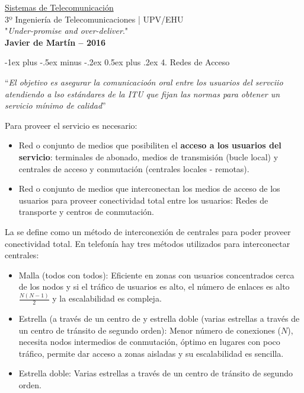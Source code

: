 \documentclass[10pt,portrait, twocolumn]{article}
\makeatletter
\renewcommand{\section}{\@startsection{section}{1}{0mm}%
                                {-1ex plus -.5ex minus -.2ex}%
                                {0.5ex plus .2ex}%
                                {\normalfont\large\bfseries}}
\makeatother
\begin{document}
\begin{framed}
	\begin{center}
    	\Large{\underline{Sistemas de Telecomunicación}} \\
    	\scriptsize{3º Ingeniería de Telecomunicaciones | UPV/EHU}\\
     	"\textsl{Under-promise and over-deliver}." \\
     	\small{\textbf{Javier de Martín -- 2016}}
	\end{center}
\end{framed}


\hrulefill

\section{4. Redes de Acceso}

\hrulefill

``\textit{El objetivo es asegurar la comunicacioón oral entre los usuarios del servciio atendiendo a lso estándares de la ITU que fijan las normas para obtener un servicio mínimo de calidad}''

Para proveer el servicio es necesario:

\begin{itemize}
	\item Red o conjunto de medios que posibiliten el \textbf{acceso a los usuarios del servicio}: terminales de abonado, medios de transmisión (bucle local) y centrales de acceso y conmutación (centrales locales - remotas).
	\item Red o conjunto de medios que interconectan los medios de acceso de los usuarios para proveer conectividad total entre los usuarios: Redes de transporte y centros de conmutación.
\end{itemize}

La  se define como un método de interconexión de centrales para poder proveer conectividad total. En telefonía hay tres métodos utilizados para interconectar centrales:

	\begin{itemize}
		\item Malla (todos con todos): Eficiente en zonas con usuarios concentrados cerca de los nodos y si el tráfico de usuarios es alto, el número de enlaces es alto $\frac{N(N-1)}{2}$ y la escalabilidad es compleja.
		\item Estrella (a través de un centro de y estrella doble (varias estrellas a través de un centro de tránsito de segundo orden): Menor número de conexiones ($N$), necesita nodos intermedios de conmutación, óptimo en lugares con poco tráfico, permite dar acceso a zonas aisladas y su escalabilidad es sencilla.
		\item Estrella doble: Varias estrellas a través de un centro de tránsito de segundo orden.
	\end{itemize}
\end{document}
